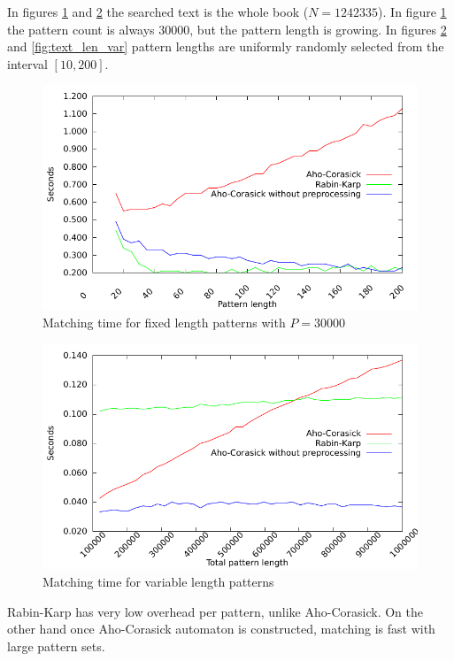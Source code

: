 \documentclass[final]{beamer}
\begin{document}
\begin{poster}
In figures \ref{fig:fixed_len} and \ref{fig:var_len} the searched text is the whole book ($N=1242335$).
In figure \ref{fig:fixed_len} the pattern count is always 30000, but the pattern length is
growing.
In figures \ref{fig:var_len} and \ref{fig:text_len_var} pattern lengths are uniformly randomly selected from the interval $[10,200]$.

\newcolumn
\begin{figure}
\centering
 \includegraphics[width=25cm]{fixed_len.pdf}
\caption{Matching time for fixed length patterns with $P=30000$}
\label{fig:fixed_len}
\end{figure}
\begin{figure}
{\centering
 \includegraphics[width=25cm]{var_len.pdf}
\caption{Matching time for variable length patterns}
\label{fig:var_len}
}
\end{figure}
\begin{small} 
Rabin-Karp has very low overhead per pattern, unlike Aho-Corasick.
On the other hand once Aho-Corasick automaton is constructed,
matching is fast with large pattern sets.
\end{small}


\end{poster}
\end{document}
